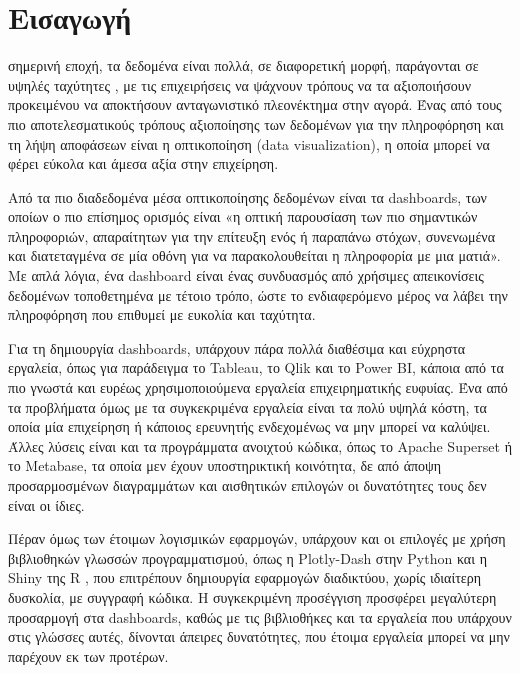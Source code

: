 \documentclass[greek, 12pt]{article}
\begin{document}
\newpage


\section{Εισαγωγή}

 σημερινή εποχή, τα δεδομένα είναι πολλά, σε διαφορετική μορφή, παράγονται σε υψηλές ταχύτητες \cite{laney20013d}, με τις επιχειρήσεις να ψάχνουν τρόπους να τα αξιοποιήσουν προκειμένου να αποκτήσουν ανταγωνιστικό πλεονέκτημα στην αγορά. \cite{ranjan2021big} Ένας από τους πιο αποτελεσματικούς τρόπους αξιοποίησης των δεδομένων για την πληροφόρηση και τη λήψη αποφάσεων είναι η οπτικοποίηση (data visualization), η οποία μπορεί να φέρει εύκολα και άμεσα αξία στην επιχείρηση. \cite{qin2020making}

Από τα πιο διαδεδομένα μέσα οπτικοποίησης δεδομένων είναι τα dashboards, των οποίων ο πιο επίσημος ορισμός είναι «η οπτική παρουσίαση των πιο σημαντικών πληροφοριών, απαραίτητων για την επίτευξη ενός ή παραπάνω στόχων, συνενωμένα και διατεταγμένα σε μία οθόνη για να παρακολουθείται η πληροφορία με μια ματιά». \cite{few2007dashboard} Με απλά λόγια, ένα dashboard είναι ένας συνδυασμός από χρήσιμες απεικονίσεις δεδομένων τοποθετημένα με τέτοιο τρόπο, ώστε το ενδιαφερόμενο μέρος να λάβει την πληροφόρηση που επιθυμεί με ευκολία και ταχύτητα.

Για τη δημιουργία dashboards, υπάρχουν πάρα πολλά διαθέσιμα και εύχρηστα εργαλεία, όπως για παράδειγμα το Tableau, το Qlik και το Power BI, κάποια από τα πιο γνωστά και ευρέως χρησιμοποιούμενα εργαλεία επιχειρηματικής ευφυίας. Ένα από τα προβλήματα όμως με τα συγκεκριμένα εργαλεία είναι τα πολύ υψηλά κόστη, τα οποία μία επιχείρηση ή κάποιος ερευνητής ενδεχομένως να μην μπορεί να καλύψει. Άλλες λύσεις είναι και τα προγράμματα ανοιχτού κώδικα, όπως το Apache Superset ή το Metabase, τα οποία μεν έχουν υποστηρικτική κοινότητα, δε από άποψη προσαρμοσμένων διαγραμμάτων και αισθητικών επιλογών οι δυνατότητες τους δεν είναι οι ίδιες.

Πέραν όμως των έτοιμων λογισμικών εφαρμογών, υπάρχουν και οι επιλογές με χρήση βιβλιοθηκών γλωσσών προγραμματισμού, όπως η Plotly-Dash στην Python \cite{inc2015collaborative} και η Shiny της R \cite{chang2024shiny}, που επιτρέπουν δημιουργία εφαρμογών διαδικτύου, χωρίς ιδιαίτερη δυσκολία, με συγγραφή κώδικα. Η συγκεκριμένη προσέγγιση προσφέρει μεγαλύτερη προσαρμογή στα dashboards, καθώς με τις βιβλιοθήκες και τα εργαλεία που υπάρχουν στις γλώσσες αυτές, δίνονται άπειρες δυνατότητες, που έτοιμα εργαλεία μπορεί να μην παρέχουν εκ των προτέρων.
\end{document}
